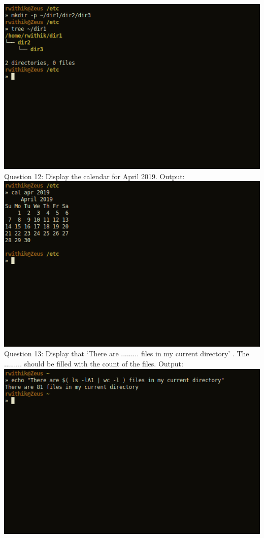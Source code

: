 \documentclass[10pt,a4paper,titlepage]{report}
\begin{document}
\includegraphics[scale=.5]{../Images/Cycle2/11.png}\newline
\newline
Question 12: Display the calendar for April 2019.\newline
Output:\newline
\includegraphics[scale=.5]{../Images/Cycle2/12.png}\pagebreak
\newline
Question 13: Display that ‘There are ......... files in my current directory’ . The ......... should be filled with the count of the files.\newline
Output:\newline
\includegraphics[scale=.5]{../Images/Cycle2/13.png}\newline
\end{document}
